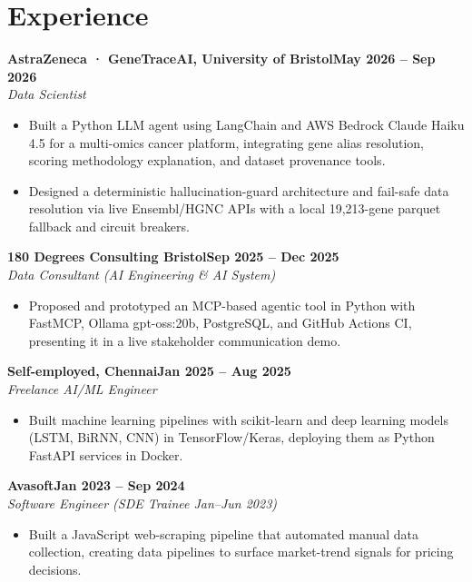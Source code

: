\documentclass[a4paper,10pt]{article}
\newcommand{\entry}[4]{\noindent\textbf{#1}\hfill\textbf{#2}\\ \textit{#3}\hfill\textit{#4}\par}
\begin{document}
\section{Experience}
\entry{AstraZeneca · GeneTraceAI, University of Bristol}{May 2026 – Sep 2026}{Data Scientist}{}
\begin{itemize}
  \item Built a Python LLM agent using LangChain and AWS Bedrock Claude Haiku 4.5 for a multi-omics cancer platform, integrating gene alias resolution, scoring methodology explanation, and dataset provenance tools.
  \item Designed a deterministic hallucination-guard architecture and fail-safe data resolution via live Ensembl/HGNC APIs with a local 19,213-gene parquet fallback and circuit breakers.
\end{itemize}
\vspace{3pt}
\entry{180 Degrees Consulting Bristol}{Sep 2025 – Dec 2025}{Data Consultant (AI Engineering \& AI System)}{}
\begin{itemize}
  \item Proposed and prototyped an MCP-based agentic tool in Python with FastMCP, Ollama gpt-oss:20b, PostgreSQL, and GitHub Actions CI, presenting it in a live stakeholder communication demo.
\end{itemize}
\vspace{3pt}
\entry{Self-employed, Chennai}{Jan 2025 – Aug 2025}{Freelance AI/ML Engineer}{}
\begin{itemize}
  \item Built machine learning pipelines with scikit-learn and deep learning models (LSTM, BiRNN, CNN) in TensorFlow/Keras, deploying them as Python FastAPI services in Docker.
\end{itemize}
\vspace{3pt}
\entry{Avasoft}{Jan 2023 – Sep 2024}{Software Engineer (SDE Trainee Jan–Jun 2023)}{}
\begin{itemize}
  \item Built a JavaScript web-scraping pipeline that automated manual data collection, creating data pipelines to surface market-trend signals for pricing decisions.
\end{itemize}

\end{document}
